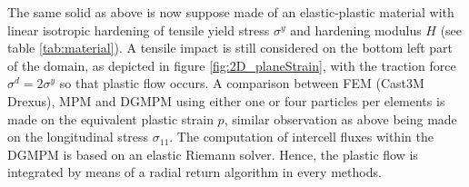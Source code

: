 The same solid as above is now suppose made of an elastic-plastic material with linear isotropic hardening of tensile yield stress $\sigma^y$ and hardening modulus $H$ (see table \ref{tab:material}). A tensile impact is still considered on the bottom left part of the domain, as depicted in figure \ref{fig:2D_planeStrain}, with the traction force $\sigma^d=2\sigma^y$ so that plastic flow occurs. A comparison between FEM (Cast3M Drexus), MPM and DGMPM using either one or four particles per elements is made on the equivalent plastic strain $p$, similar observation as above being made on the longitudinal stress $\sigma_{11}$.
The computation of intercell fluxes within the DGMPM is based on an elastic Riemann solver. Hence, the plastic flow is integrated by means of a radial return algorithm in every methods.

